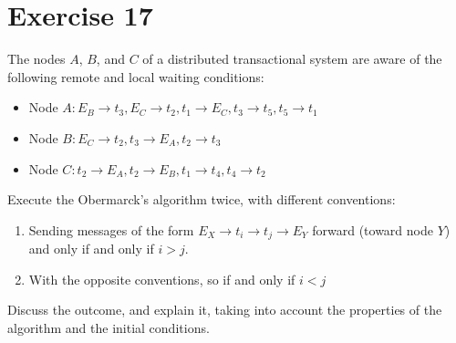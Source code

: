 \section{Exercise 17}

The nodes $A$, $B$, and $C$ of a distributed transactional system are aware of the following remote and local waiting conditions:
\begin{itemize}
    \item Node $A: E_B \rightarrow t_3, E_C \rightarrow t_2, t_1 \rightarrow E_C, t_3 \rightarrow t_5, t_5 \rightarrow t_1$
    \item Node $B: E_C \rightarrow t_2, t_3 \rightarrow E_A, t_2 \rightarrow t_3$
    \item Node $C: t_2 \rightarrow E_A, t_2 \rightarrow E_B, t_1 \rightarrow t_4, t_4 \rightarrow t_2$
\end{itemize}
Execute the Obermarck's algorithm twice, with different conventions:
\begin{enumerate}
    \item Sending messages of the form $E_X \rightarrow t_i \rightarrow t_j \rightarrow E_Y$ forward (toward node $Y$) and only if and only if $i > j$. 
    \item With the opposite conventions, so if and only if $i < j$
\end{enumerate}
Discuss the outcome, and explain it, taking into account the properties of the algorithm and the initial conditions.

